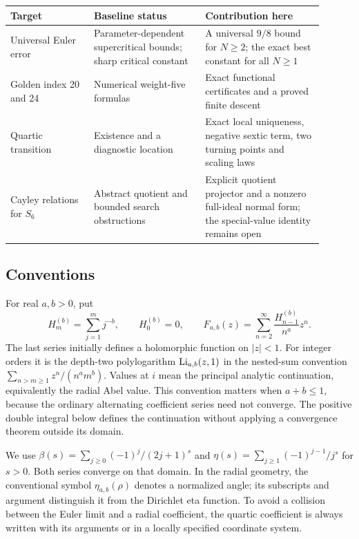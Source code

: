 \begin{center}
\small
\begin{tabular}{@{}p{0.24\linewidth}p{0.32\linewidth}p{0.34\linewidth}@{}}
\toprule
Target & Baseline status & Contribution here\\
\midrule
Universal Euler error & Parameter-dependent supercritical bounds;
sharp critical constant & A universal $9/8$ bound for $N\ge2$;
the exact best constant for all $N\ge1$\\[5pt]
Golden index 20 and 24 & Numerical weight-five formulas & Exact
functional certificates and a proved finite descent\\[5pt]
Quartic transition & Existence and a diagnostic location & Exact local
uniqueness, negative sextic term, two turning points and scaling laws\\[5pt]
Cayley relations for $S_6$ & Abstract quotient and bounded search
obstructions & Explicit quotient projector and a nonzero full-ideal
normal form; the special-value identity remains open\\
\bottomrule
\end{tabular}
\end{center}

\subsection{Conventions}

For real $a,b>0$, put
\begin{equation}\label{eq:basic-family}
 H_m^{(b)}=\sum_{j=1}^{m}j^{-b},\qquad H_0^{(b)}=0,\qquad
 F_{a,b}(z)=\sum_{n=2}^{\infty}\frac{H_{n-1}^{(b)}}{n^a}z^n.
\end{equation}
The last series initially defines a holomorphic function on $|z|<1$.
For integer orders it is the depth-two polylogarithm
$\operatorname{Li}_{a,b}(z,1)$ in the nested-sum convention
$\sum_{n>m\ge1}z^n/(n^am^b)$. Values at $i$ mean the principal analytic
continuation, equivalently the radial Abel value. This convention matters
when $a+b\le1$, because the ordinary alternating coefficient series
need not converge. The positive double integral below defines the
continuation without applying a convergence theorem outside its domain.

We use $\beta(s)=\sum_{j\ge0}(-1)^j/(2j+1)^s$ and
$\eta(s)=\sum_{j\ge1}(-1)^{j-1}/j^s$ for $s>0$. Both series converge
on that domain. In the radial geometry, the conventional symbol
$\eta_{a,b}(\rho)$ denotes a normalized angle; its subscripts and
argument distinguish it from the Dirichlet eta function. To avoid a
collision between the Euler limit and a radial coefficient, the
quartic coefficient is always written with its arguments or in a
locally specified coordinate system.

